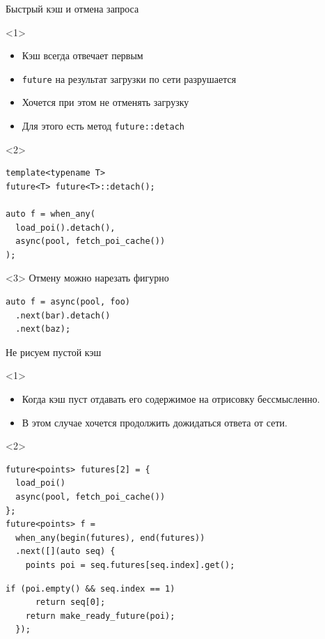 \documentclass[aspectratio=169,hyperref={unicode},17pt]{beamer}
\begin{document}
\begin{frame}[fragile,t]{Быстрый кэш и отмена запроса}
\begin{onlyenv}<1>
\begin{itemize}
 \item Кэш всегда отвечает первым
 \item \texttt{future} на результат загрузки по сети разрушается
 \item Хочется при этом не отменять загрузку
 \item Для этого есть метод \texttt{future::detach}
\end{itemize}
\end{onlyenv}
\begin{onlyenv}<2>
\begin{lstlisting}[style=cppcode]
template<typename T>
future<T> future<T>::detach();

auto f = when_any(
  load_poi().detach(),
  async(pool, fetch_poi_cache())
);
\end{lstlisting}
\end{onlyenv}
\begin{onlyenv}<3>
Отмену можно нарезать фигурно
\begin{lstlisting}[style=cppcode]
auto f = async(pool, foo)
  .next(bar).detach()
  .next(baz);
\end{lstlisting}
\end{onlyenv}
\end{frame}

\begin{frame}[fragile,t]{Не рисуем пустой кэш}
\begin{onlyenv}<1>
\begin{itemize}
 \item Когда кэш пуст отдавать его содержимое на отрисовку бессмысленно.
 \item В этом случае хочется продолжить дожидаться ответа от сети.
\end{itemize}
\end{onlyenv}
\begin{onlyenv}<2>
\begin{lstlisting}[style=cppcode,belowskip=0pt]
future<points> futures[2] = {
  load_poi()
  async(pool, fetch_poi_cache())
};
future<points> f =
  when_any(begin(futures), end(futures))
  .next([](auto seq) {
    points poi = seq.futures[seq.index].get();
\end{lstlisting}
\begin{lstlisting}[style=cppcode,backgroundcolor=\color{gray!30},aboveskip=0pt,belowskip=0pt]
    if (poi.empty() && seq.index == 1)
      return seq[0];
    return make_ready_future(poi);
  });
\end{lstlisting}
\end{onlyenv}
\end{frame}
\end{document}

